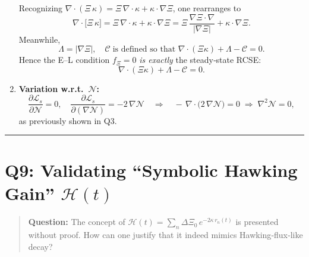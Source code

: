 \documentclass[11pt]{article}
\begin{document}
\begin{enumerate}[itemsep=0.5em]
\[    \]
    Recognizing $\nabla\cdot(\Xi\,\kappa) = \Xi\,\nabla\cdot\kappa + \kappa\cdot\nabla\Xi$, one rearranges to
    \[
      \nabla\!\cdot\bigl[\Xi\,\kappa\bigr] 
      = \Xi\,\nabla\!\cdot\kappa + \kappa\cdot\nabla\Xi 
      = \Xi\,\frac{\nabla\Xi\cdot\nabla}{|\nabla\Xi|} + \kappa\cdot\nabla\Xi.
    \]
    Meanwhile, 
    \[
      \Lambda = |\nabla\Xi|,\quad
      \mathcal C \;\text{is defined so that } \nabla\!\cdot(\Xi\kappa)+\Lambda-\mathcal C=0.
    \]
    Hence the E–L condition $f_\Xi=0$ \emph{is exactly} the steady‐state RCSE:
    \[
      \nabla\!\cdot(\Xi\kappa) + \Lambda - \mathcal C = 0.
    \]
  \item \textbf{Variation w.r.t.\ $\mathcal N$:}  
    \[
      \frac{\partial\mathcal L_s}{\partial\mathcal N} = 0,\quad
      \frac{\partial\mathcal L_s}{\partial(\nabla\mathcal N)} 
      = -2\,\nabla\mathcal N 
      \quad\Longrightarrow\quad
      -\,\nabla\cdot\bigl(2\,\nabla\mathcal N\bigr) = 0 
      \;\Longrightarrow\; \nabla^2 \mathcal N = 0,
    \]
    as previously shown in Q3.  
\end{enumerate}

\vspace{1em}
\hrule

\section*{Q9: Validating “Symbolic Hawking Gain” $\mathcal H(t)$}
\begin{quote}
\textbf{Question:} The concept of $\mathcal H(t) = \sum_n \Delta\Xi_0\,e^{-2\kappa\,r_n(t)}$ is presented without proof. How can one justify that it indeed mimics Hawking‐flux‐like decay?
\end{quote}
\end{document}
